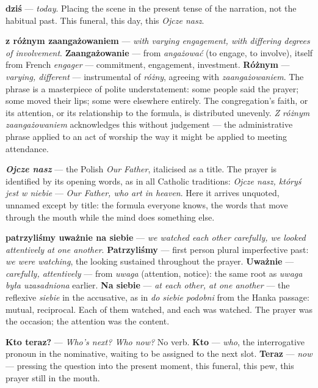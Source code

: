 \textbf{dziś} --- \textit{today}. Placing the scene in
the present tense of the narration, not the habitual
past. This funeral, this day, this \textit{Ojcze nasz}.

\textbf{z różnym zaangażowaniem} --- \textit{with varying
engagement, with differing degrees of involvement}.
\textbf{Zaangażowanie} --- from \textit{angażować} (to
engage, to involve), itself from French \textit{engager}
--- commitment, engagement, investment. \textbf{Różnym}
--- \textit{varying, different} --- instrumental of
\textit{różny}, agreeing with \textit{zaangażowaniem}.
The phrase is a masterpiece of polite understatement:
some people said the prayer; some moved their lips; some
were elsewhere entirely. The congregation's faith, or
its attention, or its relationship to the formula, is
distributed unevenly. \textit{Z różnym zaangażowaniem}
acknowledges this without judgement --- the administrative
phrase applied to an act of worship the way it might
be applied to meeting attendance.

\textbf{\textit{Ojcze nasz}} --- the Polish \textit{Our
Father}, italicised as a title. The prayer is identified
by its opening words, as in all Catholic traditions:
\textit{Ojcze nasz, któryś jest w niebie} --- \textit{Our
Father, who art in heaven}. Here it arrives unquoted,
unnamed except by title: the formula everyone knows,
the words that move through the mouth while the mind
does something else.

\textbf{patrzyliśmy uważnie na siebie} --- \textit{we
watched each other carefully, we looked attentively at
one another}. \textbf{Patrzyliśmy} --- first person
plural imperfective past: \textit{we were watching}, the
looking sustained throughout the prayer. \textbf{Uważnie}
--- \textit{carefully, attentively} --- from
\textit{uwaga} (attention, notice): the same root as
\textit{uwaga była uzasadniona} earlier. \textbf{Na
siebie} --- \textit{at each other, at one another} ---
the reflexive \textit{siebie} in the accusative, as in
\textit{do siebie podobni} from the Hanka passage:
mutual, reciprocal. Each of them watched, and each was
watched. The prayer was the occasion; the attention was
the content.

\medskip

\textbf{Kto teraz?} --- \textit{Who's next? Who now?}
No verb. \textbf{Kto} --- \textit{who}, the interrogative
pronoun in the nominative, waiting to be assigned to the
next slot. \textbf{Teraz} --- \textit{now} --- pressing
the question into the present moment, this funeral, this
pew, this prayer still in the mouth.

